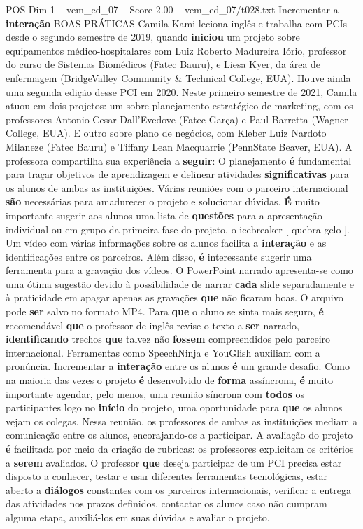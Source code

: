 \begin{textsample}{POS Dim 1 – vem\_ed\_07 – Score 2.00 – vem\_ed\_07/t028.txt}  \label{ex:f1_pos_185}
Incrementar a \textbf{interação} BOAS PRÁTICAS Camila Kami leciona inglês e trabalha com PCIs desde o segundo semestre de 2019, quando \textbf{iniciou} um projeto sobre equipamentos médico-hospitalares com Luiz Roberto Madureira Iório, professor do curso de Sistemas Biomédicos (Fatec Bauru), e Liesa Kyer, da área de enfermagem (BridgeValley Community \& Technical College, EUA).
Houve ainda uma segunda edição desse PCI em 2020.
Neste primeiro semestre de 2021, Camila atuou em dois projetos: um sobre planejamento estratégico de marketing, com os professores Antonio Cesar Dall’Evedove (Fatec Garça) e Paul Barretta (Wagner College, EUA).
E outro sobre plano de negócios, com Kleber Luiz Nardoto Milaneze (Fatec Bauru) e Tiffany Lean Macquarrie (PennState Beaver, EUA).
A professora compartilha sua experiência a \textbf{seguir}: O planejamento \textbf{é} fundamental para traçar objetivos de aprendizagem e delinear atividades \textbf{significativas} para os alunos de ambas as instituições.
Várias reuniões com o parceiro internacional \textbf{são} necessárias para amadurecer o projeto e solucionar dúvidas. \textbf{É} muito importante sugerir aos alunos uma lista de \textbf{questões} para a apresentação individual ou em grupo da primeira fase do projeto, o icebreaker [ quebra-gelo ].
Um vídeo com várias informações sobre os alunos facilita a \textbf{interação} e as identificações entre os parceiros.
Além disso, \textbf{é} interessante sugerir uma ferramenta para a gravação dos vídeos.
O PowerPoint narrado apresenta-se como uma ótima sugestão devido à possibilidade de narrar \textbf{cada} slide separadamente e à praticidade em apagar apenas as gravações \textbf{que} não ficaram boas.
O arquivo pode \textbf{ser} salvo no formato MP4.
Para \textbf{que} o aluno se sinta mais seguro, \textbf{é} recomendável \textbf{que} o professor de inglês revise o texto a \textbf{ser} narrado, \textbf{identificando} trechos \textbf{que} talvez não \textbf{fossem} compreendidos pelo parceiro internacional.
Ferramentas como SpeechNinja e YouGlish auxiliam com a pronúncia.
Incrementar a \textbf{interação} entre os alunos \textbf{é} um grande desafio.
Como na maioria das vezes o projeto \textbf{é} desenvolvido de \textbf{forma} assíncrona, \textbf{é} muito importante agendar, pelo menos, uma reunião síncrona com \textbf{todos} os participantes logo no \textbf{início} do projeto, uma oportunidade para \textbf{que} os alunos vejam os colegas.
Nessa reunião, os professores de ambas as instituições mediam a comunicação entre os alunos, encorajando-os a participar.
A avaliação do projeto \textbf{é} facilitada por meio da criação de rubricas: os professores explicitam os critérios a \textbf{serem} avaliados.
O professor \textbf{que} deseja participar de um PCI precisa estar disposto a conhecer, testar e usar diferentes ferramentas tecnológicas, estar aberto a \textbf{diálogos} constantes com os parceiros internacionais, verificar a entrega das atividades nos prazos definidos, contactar os alunos caso não cumpram alguma etapa, auxiliá-los em suas dúvidas e avaliar o projeto.

\end{textsample}

